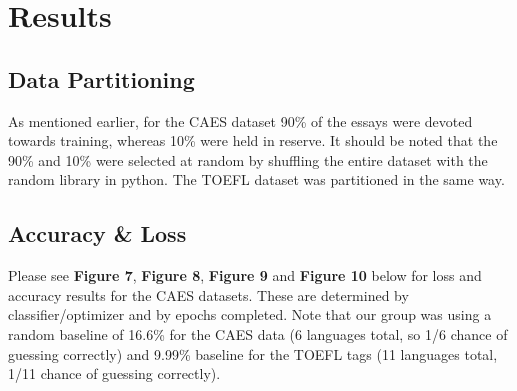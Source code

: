 \documentclass[11pt,a4paper]{article}
\begin{document}
\section{Results}
\subsection{Data Partitioning}
As mentioned earlier, for the CAES dataset 90\% of the essays were devoted towards training, whereas 10\% were held in reserve. It should be noted that the 90\% and 10\% were selected at random by shuffling the entire dataset with the random library in python. The TOEFL dataset was partitioned in the same way.
\subsection{Accuracy \& Loss}
Please see \textbf{Figure 7}, \textbf{Figure 8}, \textbf{Figure 9} and \textbf{Figure 10} below for loss and accuracy results for the CAES datasets. These are determined by classifier/optimizer and by epochs completed. Note that our group was using a random baseline of 16.6\% for the CAES data (6 languages total, so 1/6 chance of guessing correctly) and 9.99\% baseline for the TOEFL tags (11 languages total, 1/11 chance of guessing correctly). \\
\end{document}
